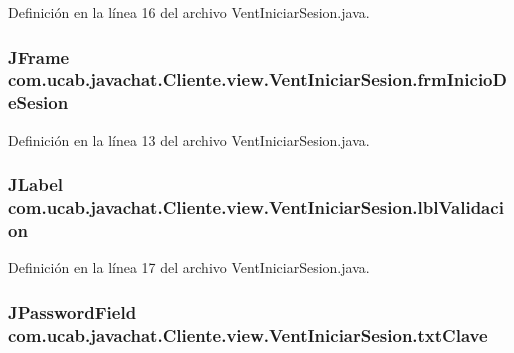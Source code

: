 Definición en la línea 16 del archivo Vent\-Iniciar\-Sesion.\-java.

\hypertarget{classcom_1_1ucab_1_1javachat_1_1_cliente_1_1view_1_1_vent_iniciar_sesion_ae856c96e708fb56f72bc9cbc5d7fa2e6}{
\subsubsection[{frm\-Inicio\-De\-Sesion}]{\setlength{\rightskip}{0pt plus 5cm}J\-Frame com.\-ucab.\-javachat.\-Cliente.\-view.\-Vent\-Iniciar\-Sesion.\-frm\-Inicio\-De\-Sesion}}\label{classcom_1_1ucab_1_1javachat_1_1_cliente_1_1view_1_1_vent_iniciar_sesion_ae856c96e708fb56f72bc9cbc5d7fa2e6}


Definición en la línea 13 del archivo Vent\-Iniciar\-Sesion.\-java.

\hypertarget{classcom_1_1ucab_1_1javachat_1_1_cliente_1_1view_1_1_vent_iniciar_sesion_acbc2aba983ddff4636b19495fed687ad}{
\subsubsection[{lbl\-Validacion}]{\setlength{\rightskip}{0pt plus 5cm}J\-Label com.\-ucab.\-javachat.\-Cliente.\-view.\-Vent\-Iniciar\-Sesion.\-lbl\-Validacion}}\label{classcom_1_1ucab_1_1javachat_1_1_cliente_1_1view_1_1_vent_iniciar_sesion_acbc2aba983ddff4636b19495fed687ad}


Definición en la línea 17 del archivo Vent\-Iniciar\-Sesion.\-java.

\hypertarget{classcom_1_1ucab_1_1javachat_1_1_cliente_1_1view_1_1_vent_iniciar_sesion_a0f3064f6c169e2791341e6050b2d4fcb}{
\subsubsection[{txt\-Clave}]{\setlength{\rightskip}{0pt plus 5cm}J\-Password\-Field com.\-ucab.\-javachat.\-Cliente.\-view.\-Vent\-Iniciar\-Sesion.\-txt\-Clave}}\label{classcom_1_1ucab_1_1javachat_1_1_cliente_1_1view_1_1_vent_iniciar_sesion_a0f3064f6c169e2791341e6050b2d4fcb}


